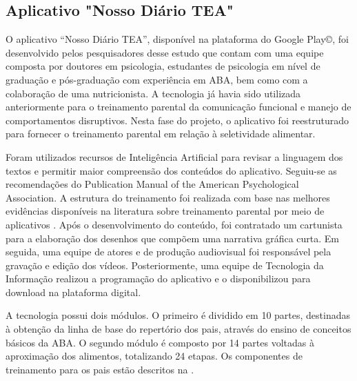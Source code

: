 \documentclass[portuguese]{textolivre}
\begin{document}
\subsection{Aplicativo "Nosso Diário TEA"}\label{sec-conduta}
O aplicativo “Nosso Diário TEA”, disponível na plataforma do Google Play©, foi desenvolvido pelos pesquisadores desse estudo que contam com uma equipe composta por doutores em psicologia, estudantes de psicologia em nível de graduação e pós-graduação com experiência em ABA, bem como com a colaboração de uma nutricionista. A tecnologia já havia sido utilizada anteriormente para o treinamento parental da comunicação funcional e manejo de comportamentos disruptivos. Nesta fase do projeto, o aplicativo foi reestruturado para fornecer o treinamento parental em relação à seletividade alimentar.

Foram utilizados recursos de Inteligência Artificial para revisar a linguagem dos textos e permitir maior compreensão dos conteúdos do aplicativo. Seguiu-se as recomendações do Publication Manual of the American Psychological Association. A estrutura do treinamento foi realizada com base nas melhores evidências disponíveis na literatura sobre treinamento parental por meio de aplicativos \cite{correaferreira2025treinamento,kral2023mobilehealth}. Após o desenvolvimento do conteúdo, foi contratado um cartunista para a elaboração dos desenhos que compõem uma narrativa gráfica curta. Em seguida, uma equipe de atores e de produção audiovisual foi responsável pela gravação e edição dos vídeos. Posteriormente, uma equipe de Tecnologia da Informação realizou a programação do aplicativo e o disponibilizou para download na plataforma digital.

A tecnologia possui dois módulos. O primeiro é dividido em 10 partes, destinadas à obtenção da linha de base do repertório dos pais, através do ensino de conceitos básicos da ABA. O segundo módulo é composto por 14 partes voltadas à aproximação dos alimentos, totalizando 24 etapas. Os componentes de treinamento para os pais estão descritos na .
\end{document}

